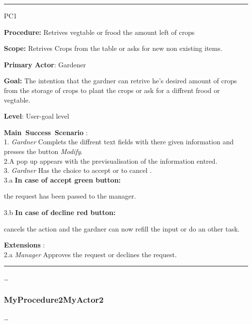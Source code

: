 \vspace{0.5cm}
\hrule
\hfill \break
\begin{lyxlist}{PC1}
\small{
\item [\textbf{Procedure:}] Retrives vegtable or
frood the amount left of crops
\item [\textbf{Scope:}] Retrives Crops from the table or asks for new non
existing items.
\item [\textbf{Primary Actor}:] Gardener
\item [\textbf{Goal:}] The intention that the gardner can retrive he's desired
amount of crops from the storage of crops to plant the crops or ask for a
diffrent frood or vegtable.
\item [\textbf{Level}:] User-goal level
\item [\textbf{Main~Success~Scenario}]:\\
1. \emph{Gardner} Complets the diffrent text fields with there given
information and presses the button \emph{Modify}. \\
2.A pop up appears with the previsualisation of the information entred.\\
3. \emph{Gardner} Has the choice to accept or to cancel .\\
	3.a \textbf{In case of accept green button:}
		\begin{Tab}{2em}  the request has been passed to the manager.\end{Tab}
	3.b \textbf{In case of decline red button:}
		\begin{Tab}{2em} cancels the action and the gardner can
		now refill the input or do an other task. \end{Tab}
\item [\textbf{Extensions}]:\\
2.a  \emph{Manager} Approves the request or declines the request.\\
}
\end{lyxlist}
\hrule
\vspace{0.5cm}

\ldots

\subsubsection{MyProcedure2MyActor2}
\ldots














